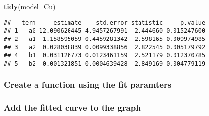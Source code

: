 \documentclass[]{book}
\newenvironment{Shaded}{\begin{snugshade}}{\end{snugshade}}
\newcommand{\ControlFlowTok}[1]{\textcolor[rgb]{0.13,0.29,0.53}{\textbf{#1}}}
\newcommand{\DecValTok}[1]{\textcolor[rgb]{0.00,0.00,0.81}{#1}}
\newcommand{\KeywordTok}[1]{\textcolor[rgb]{0.13,0.29,0.53}{\textbf{#1}}}
\newcommand{\NormalTok}[1]{#1}
\newcommand{\OperatorTok}[1]{\textcolor[rgb]{0.81,0.36,0.00}{\textbf{#1}}}
\newcommand{\StringTok}[1]{\textcolor[rgb]{0.31,0.60,0.02}{#1}}
\theoremstyle{definition}
\theoremstyle{definition}
\theoremstyle{definition}
\theoremstyle{remark}
\begin{document}
\begin{Shaded}
\begin{Highlighting}[]
\KeywordTok{tidy}\NormalTok{(model_Cu)}
\end{Highlighting}
\end{Shaded}

\begin{verbatim}
##   term     estimate    std.error statistic     p.value
## 1   a0 12.090620445 4.9457267991  2.444660 0.015247600
## 2   a1 -1.158595059 0.4459281342 -2.598165 0.009974985
## 3   a2  0.028038839 0.0099338856  2.822545 0.005179792
## 4   b1  0.031126773 0.0123461159  2.521179 0.012370785
## 5   b2  0.001321851 0.0004639428  2.849169 0.004779119
\end{verbatim}

\hypertarget{create-a-function-using-the-fit-paramters}{%
\subsubsection{Create a function using the fit
paramters}\label{create-a-function-using-the-fit-paramters}}

\begin{Shaded}
\end{Shaded}

\hypertarget{add-the-fitted-curve-to-the-graph}{%
\subsubsection{Add the fitted curve to the
graph}\label{add-the-fitted-curve-to-the-graph}}
\end{document}
